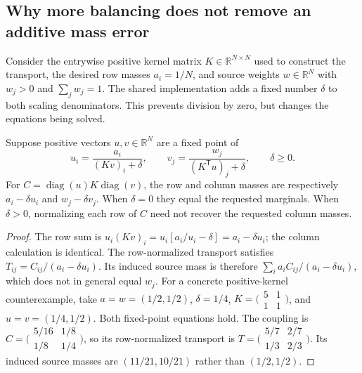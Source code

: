 \subsection{Why more balancing does not remove an additive mass error}

Consider the entrywise positive kernel matrix $K\in\mathbb R^{N\times N}$
used to construct the transport, the desired row masses $a_i=1/N$, and
source weights $w\in\mathbb R^N$ with $w_j>0$ and $\sum_j w_j=1$. The shared
implementation adds a fixed number $\delta$ to both scaling denominators.
This prevents division by zero, but changes the equations being solved.

\begin{proposition}
\label{prop:bg-additive-scaling}
Suppose positive vectors $u,v\in\mathbb R^N$ are a fixed point of
\begin{equation}
 u_i=\frac{a_i}{(Kv)_i+\delta},\qquad
 v_j=\frac{w_j}{(K^{\mathsf T}u)_j+\delta},\qquad \delta\geq0.
 \label{eq:bg-additive-scaling}
\end{equation}
For $C=\operatorname{diag}(u)K\operatorname{diag}(v)$, the row and column
masses are respectively $a_i-\delta u_i$ and $w_j-\delta v_j$.
When $\delta=0$ they equal the requested marginals. When $\delta>0$,
normalizing each row of $C$ need not recover the requested column masses.
\end{proposition}
\begin{proof}
The row sum is $u_i(Kv)_i=u_i[a_i/u_i-\delta]=a_i-\delta u_i$;
the column calculation is identical. The row-normalized transport satisfies
$T_{ij}=C_{ij}/(a_i-\delta u_i)$. Its induced source mass is therefore
$\sum_i a_iC_{ij}/(a_i-\delta u_i)$, which does not in general equal $w_j$.
For a concrete positive-kernel counterexample, take $a=w=(1/2,1/2)$,
$\delta=1/4$, $K=\bigl(\begin{smallmatrix}5&1\\1&1\end{smallmatrix}\bigr)$,
and $u=v=(1/4,1/2)$. Both fixed-point equations hold. The coupling is
$C=\bigl(\begin{smallmatrix}5/16&1/8\\1/8&1/4\end{smallmatrix}\bigr)$,
so its row-normalized transport is
$T=\bigl(\begin{smallmatrix}5/7&2/7\\1/3&2/3\end{smallmatrix}\bigr)$.
Its induced source masses are $(11/21,10/21)$ rather than $(1/2,1/2)$.
\end{proof}

